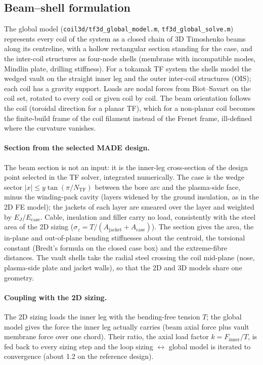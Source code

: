 \subsection{Beam--shell formulation}
The global model (\texttt{coil3d/tf3d\_global\_model.m},
\texttt{tf3d\_global\_solve.m}) represents every coil of the system as a
closed chain of 3D Timoshenko beams along its centreline, with a hollow
rectangular section standing for the case, and the inter-coil structures
as four-node shells (membrane with incompatible modes, Mindlin plate,
drilling stiffness). For a tokamak TF system the shells model the wedged
vault on the straight inner leg and the outer inter-coil structures (OIS);
each coil has a gravity support. Loads are nodal forces from Biot--Savart
on the coil set, rotated to every coil or given coil by coil. The beam
orientation follows the coil (toroidal direction for a planar TF), which
for a non-planar coil becomes the finite-build frame of the coil
filament instead of the Frenet frame, ill-defined where the curvature
vanishes.

\paragraph{Section from the selected MADE design.} The beam section is not
an input: it is the inner-leg cross-section of the design point selected
in the TF solver, integrated numerically. The case is the wedge sector
$|x|\le y\tan(\pi/N_\mathrm{TF})$ between the bore arc and the
plasma-side face, minus the winding-pack cavity (layers widened by the
ground insulation, as in the 2D FE model); the jackets of each layer are
smeared over the layer and weighted by $E_J/E_\mathrm{case}$. Cable,
insulation and filler carry no load, consistently with the steel area of
the 2D sizing ($\sigma_z=T/(A_\mathrm{jacket}+A_\mathrm{case})$). The
section gives the area, the in-plane and out-of-plane bending stiffnesses
about the centroid, the torsional constant (Bredt's formula on the closed
case box) and the extreme-fibre distances. The vault shells take the
radial steel crossing the coil mid-plane (nose, plasma-side plate and
jacket walls), so that the 2D and 3D models share one geometry.

\paragraph{Coupling with the 2D sizing.} The 2D sizing loads the inner
leg with the bending-free tension $T$; the global model gives the force
the inner leg actually carries (beam axial force plus vault membrane
force over one chord). Their ratio, the axial load factor
$k=F_\mathrm{inner}/T$, is fed back to every sizing step and the loop
sizing $\leftrightarrow$ global model is iterated to convergence
(about 1.2 on the reference design).

